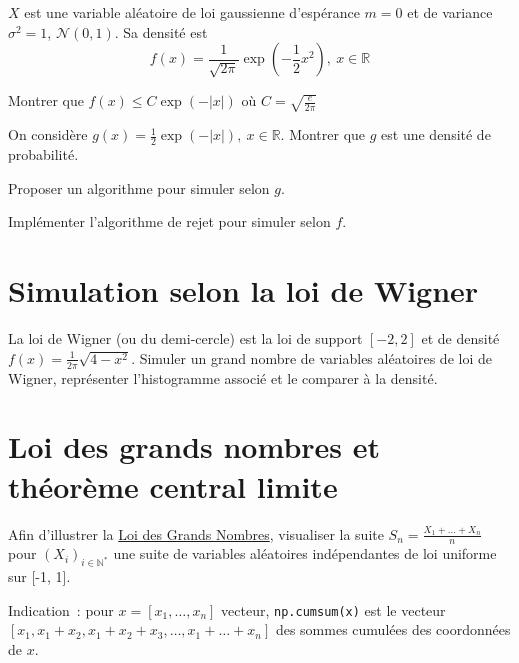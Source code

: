 \(X\) est une variable aléatoire de loi gaussienne d'espérance \(m=0\)
et de variance \(\sigma^2=1\), \(\mathcal{N}(0,1)\). Sa densité est
\[f(x) = \frac{1}{\sqrt{2\pi}}\exp\left(-\frac{1}{2}x^2\right),~x\in \mathbb{R}\]

\label{V-lgrej1}
Montrer que \(f(x) \leq C \exp \left(-|x|\right)\) où
\(C=\sqrt{\frac{e}{2\pi}}\)

\label{V-lgrej2}
On considère
\(g(x) = \frac{1}{2}\exp \left(-|x|\right),~x\in \mathbb{R}\). Montrer
que \(g\) est une densité de probabilité.

\label{V-lgrej3}
Proposer un algorithme pour simuler selon \(g\).

\label{V-lgrej4}
Implémenter l'algorithme de rejet pour simuler selon
\(f\).

\section{Simulation selon la loi de Wigner}\label{V-wigner}

La loi de Wigner (ou du demi-cercle) est la loi de support \([-2, 2]\)
et de densité \(f(x) = \frac{1}{2\pi}\sqrt{4 - x^2}\). Simuler un grand
nombre de variables aléatoires de loi de Wigner, représenter
l'histogramme associé et le comparer à la
densité.

\section{Loi des grands nombres et théorème central
limite}\label{V-loi-des-grands-nombres-et-thuxe9oruxe8me-central-limite}

\label{V-lgntcl1}
Afin d'illustrer la \href{Probabilité\%20IV.pdf\%20\#lfgn}{Loi des
Grands Nombres}, visualiser la suite
\(S_n = \frac{X_1 + \ldots +X_n}{n}\) pour
\((X_i)_{i \in \mathbb{N}^\ast}\) une suite de variables aléatoires
indépendantes de loi uniforme sur {[}-1, 1{]}.

Indication~: pour \(x= [x_1 , \ldots, x_n]\) vecteur,
\texttt{np.cumsum(x)} est le vecteur
\([x_1 , x_1 + x_2 , x_1 + x_2 + x_3 , \ldots , x_1 + \ldots + x_n]\)
des sommes cumulées des coordonnées de \(x\).

